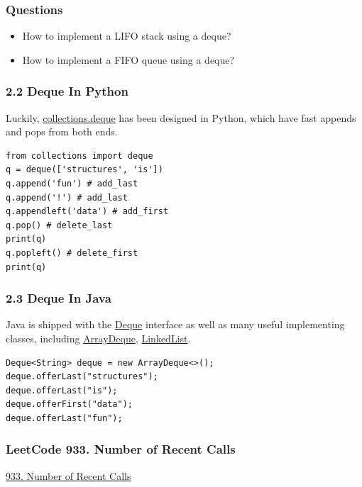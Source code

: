 \documentclass[aspectratio=169, 14pt]{beamer}
\begin{document}
\begin{frame}
	\frametitle{Questions}
	\begin{itemize}
		\item {\large {}} How to implement a LIFO stack using a deque?
		\item {\large {}} How to implement a FIFO queue using a deque?
	\end{itemize}
\end{frame}

\begin{frame}[fragile]
	\frametitle{2.2 Deque In Python}

	Luckily, \href{https://docs.python.org/3/library/collections.html}{collections.deque} has been designed in Python, which have fast appends and pops from both ends.

	\begin{verbatim}
from collections import deque
q = deque(['structures', 'is'])
q.append('fun') # add_last
q.append('!') # add_last
q.appendleft('data') # add_first
q.pop() # delete_last
print(q)
q.popleft() # delete_first
print(q)
    \end{verbatim}

\end{frame}

\begin{frame}[fragile]
	\frametitle{2.3 Deque In Java}
	Java is shipped with the \href{https://docs.oracle.com/en/java/javase/11/docs/api/java.base/java/util/Deque.html}{Deque} interface as well as many useful implementing classes, including \href{https://docs.oracle.com/en/java/javase/11/docs/api/java.base/java/util/ArrayDeque.html}{ArrayDeque}, \href{https://docs.oracle.com/en/java/javase/11/docs/api/java.base/java/util/LinkedList.html}{LinkedList}.
	\begin{verbatim}
Deque<String> deque = new ArrayDeque<>();
deque.offerLast("structures");
deque.offerLast("is");
deque.offerFirst("data");
deque.offerLast("fun");
    \end{verbatim}
\end{frame}

\begin{frame}[fragile]
	\frametitle{LeetCode 933. Number of Recent Calls}
	\href{https://github.com/doocs/leetcode/blob/main/solution/0900-0999/0933.Number%20of%20Recent%20Calls/README_EN.md}{933. Number of Recent Calls}

\end{frame}
\end{document}
